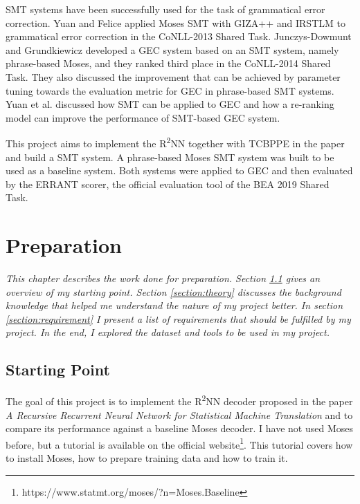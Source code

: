 \documentclass[12pt,a4paper,twoside,openright]{report}
\begin{document}
SMT systems have been successfully used for the task of grammatical error correction. Yuan and Felice\cite{yuan-felice-2013-constrained} applied Moses SMT with GIZA++ and IRSTLM to grammatical error correction in the CoNLL-2013 Shared Task\cite{ng-etal-2013-conll}. Junczys-Dowmunt and Grundkiewicz\cite{junczys-dowmunt-grundkiewicz-2014-amu} developed a GEC system based on an SMT system, namely phrase-based Moses\cite{moses}, and they ranked third place in the CoNLL-2014 Shared Task\cite{ng-etal-2014-conll}. They also discussed the improvement that can be achieved by parameter tuning towards the evaluation metric for GEC in phrase-based SMT systems\cite{junczys-dowmunt-grundkiewicz-2016-phrase}. Yuan et al.\cite{yuan-etal-2016-candidate} discussed how SMT can be applied to GEC and how a re-ranking model can improve the performance of SMT-based GEC system. 

This project aims to implement the R\textsuperscript{2}NN together with TCBPPE in the paper\cite{r2nn} and build a SMT system. A phrase-based Moses SMT system\cite{moses} was built to be used as a baseline system. Both systems were applied to GEC and then evaluated by the ERRANT scorer\cite{bryant-etal-2017-automatic}\cite{felice-etal-2016-automatic}, the official evaluation tool of the BEA 2019 Shared Task\cite{bryant-etal-2019-bea}.


\chapter{Preparation}
\textit{This chapter describes the work done for preparation. Section \ref{section:start} gives an overview of my starting point. Section \ref{section:theory} discusses the background knowledge that helped me understand the nature of my project better. In section \ref{section:requirement} I present a list of requirements that should be fulfilled by my project. In the end, I explored the dataset and tools to be used in my project.}

\section{Starting Point}\label{section:start}

The goal of this project is to implement the R\textsuperscript{2}NN decoder proposed in the paper \textit{A Recursive Recurrent Neural Network for Statistical Machine Translation}\cite{r2nn} and to compare its performance against a baseline Moses decoder. I have not used Moses\cite{moses} before, but a tutorial is available on the official website\footnote{https://www.statmt.org/moses/?n=Moses.Baseline}. This tutorial covers how to install Moses, how to prepare training data and how to train it.
\end{document}
